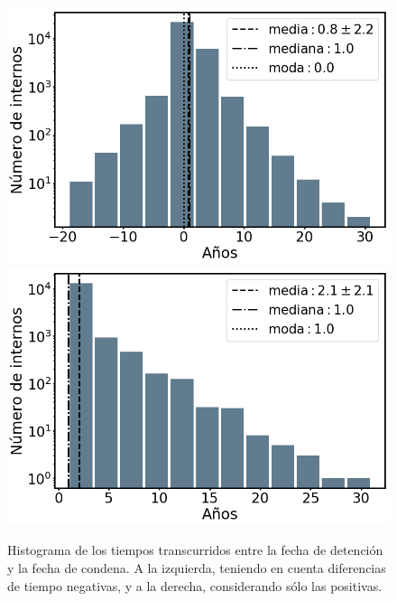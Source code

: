 \documentclass[10pt]{article}
\begin{document}
\begin{figure}[H]
	\centering
	\includegraphics[scale=0.3]{graficos/diff_condenado_detencion_negativos.png}%
	\includegraphics[scale=0.3]{graficos/diff_condenado_detencion.png}
	\caption{Histograma de los tiempos transcurridos entre la fecha de detenci\'on y la fecha de condena. A la izquierda, teniendo en cuenta diferencias de tiempo negativas, y a la derecha, considerando s\'olo las positivas. \label{fig:tiempo_detencion_condena}}
\end{figure}
\end{document}
